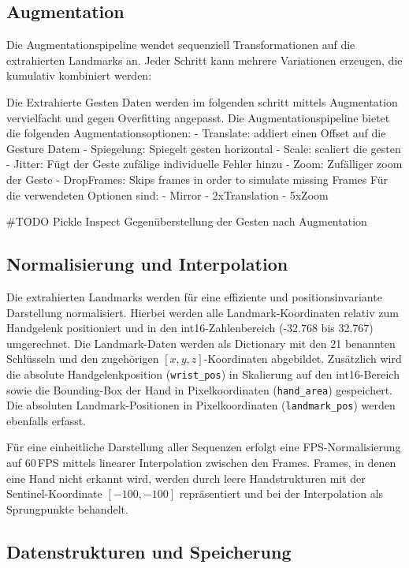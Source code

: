 \subsection{Augmentation}

Die Augmentationspipeline wendet sequenziell Transformationen auf die extrahierten Landmarks an. Jeder Schritt kann mehrere Variationen erzeugen, die kumulativ kombiniert werden:

Die Extrahierte Gesten Daten werden im folgenden schritt mittels Augmentation vervielfacht und gegen Overfitting angepasst. Die Augmentationspipeline bietet  die folgenden Augmentationsoptionen:
- Translate: addiert einen Offset auf die Gesture Datem
- Spiegelung: Spiegelt gesten horizontal
- Scale: scaliert die gesten
- Jitter: Fügt der Geste zufälige individuelle  Fehler hinzu
- Zoom: Zufälliger zoom der Geste
- DropFrames: Skips frames in order to simulate missing Frames
Für die verwendeten Optionen sind:
- Mirror
- 2xTranslation
- 5xZoom

\#TODO Pickle Inspect Gegenüberstellung der Gesten nach Augmentation

\subsection{Normalisierung und Interpolation}

Die extrahierten Landmarks werden für eine effiziente und positionsinvariante Darstellung normalisiert. Hierbei werden alle Landmark-Koordinaten relativ zum Handgelenk positioniert und in den int16-Zahlenbereich ({-}32.768 bis 32.767) umgerechnet. Die Landmark-Daten werden als Dictionary mit den 21 benannten Schlüsseln und den zugehörigen \([x, y, z]\)-Koordinaten abgebildet. Zusätzlich wird die absolute Handgelenkposition (\texttt{wrist\_pos}) in Skalierung auf den int16-Bereich sowie die Bounding-Box der Hand in Pixelkoordinaten (\texttt{hand\_area}) gespeichert. Die absoluten Landmark-Positionen in Pixelkoordinaten (\texttt{landmark\_pos}) werden ebenfalls erfasst.

Für eine einheitliche Darstellung aller Sequenzen erfolgt eine FPS-Normalisierung auf 60\,FPS mittels linearer Interpolation zwischen den Frames. Frames, in denen eine Hand nicht erkannt wird, werden durch leere Handstrukturen mit der Sentinel-Koordinate \([{-100}, {-100}]\) repräsentiert und bei der Interpolation als Sprungpunkte behandelt.

\subsection{Datenstrukturen und Speicherung}

